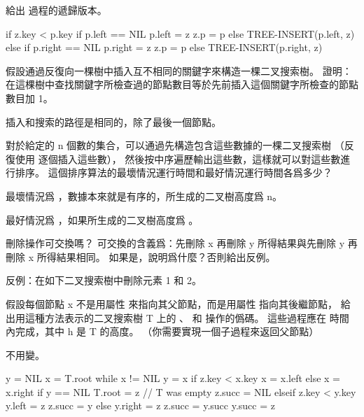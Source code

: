 \startsection[
  title={Insertion and deletion},
]

\startEXERCISE
給出  過程的遞歸版本。
\stopEXERCISE

\startANSWER
{}
\startCLRS
if z.key < p.key
	if p.left == NIL
		p.left = z
		z.p = p
	else TREE-INSERT(p.left, z)
else
	if p.right == NIL
		p.right = z
		z.p = p
	else TREE-INSERT(p.right, z)
\stopCLRS
\stopANSWER

\startEXERCISE
假設通過反復向一棵樹中插入互不相同的關鍵字來構造一棵二叉搜索樹。
證明：在這棵樹中查找關鍵字所檢查過的節點數目等於先前插入這個關鍵字所檢查的節點數目加 1。
\stopEXERCISE

\startANSWER
插入和搜索的路徑是相同的，除了最後一個節點。
\stopANSWER

\startEXERCISE
對於給定的 n 個數的集合，可以通過先構造包含這些數據的一棵二叉搜索樹
（反復使用  逐個插入這些數），
然後按中序遍歷輸出這些數，這樣就可以對這些數進行排序。
這個排序算法的最壞情況運行時間和最好情況運行時間各爲多少？
\stopEXERCISE

\startANSWER
最壞情況爲 ，數據本來就是有序的，所生成的二叉樹高度爲 n。

最好情況爲 ，如果所生成的二叉樹高度爲 。
\stopANSWER

\startEXERCISE
刪除操作可交換嗎？
可交換的含義爲：先刪除 x 再刪除 y 所得結果與先刪除 y 再刪除 x 所得結果相同。
如果是，說明爲什麼？否則給出反例。
\stopEXERCISE

\startANSWER
反例：在如下二叉搜索樹中刪除元素 1 和 2。
\externalfigure[output/e12_3_4-1]
\stopANSWER

\startEXERCISE
假設每個節點 x 不是用屬性  來指向其父節點，而是用屬性  指向其後繼節點，
給出用這種方法表示的二叉搜索樹 T 上的 、  和  操作的僞碼。
這些過程應在  時間內完成，其中 h 是 T 的高度。
（\hint 你需要實現一個子過程來返回父節點）
\stopEXERCISE

\startANSWER
{}

 不用變。

\startCLRS
y = NIL
x = T.root
while x != NIL
	y = x
	if z.key < x.key
		x = x.left
	else
		x = x.right
if y == NIL
	T.root = z	// T was empty
	z.succ = NIL
elseif z.key < y.key
	y.left = z
	z.succ = y
else
	y.right = z
	z.succ = y.succ
	y.succ = z
\stopCLRS

